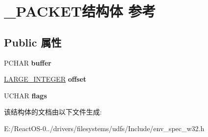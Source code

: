 \hypertarget{struct___p_a_c_k_e_t}{}\section{\+\_\+\+P\+A\+C\+K\+E\+T结构体 参考}
\label{struct___p_a_c_k_e_t}
\subsection*{Public 属性}
\begin{DoxyCompactItemize}
\item 
\mbox{\label{struct___p_a_c_k_e_t_aeac901f907c2020dc5aee0c5df40a0bc}} 
P\+C\+H\+AR {\bfseries buffer}
\item 
\mbox{\label{struct___p_a_c_k_e_t_a900ff47b35059510fbf101e12e41df64}} 
\hyperlink{union___l_a_r_g_e___i_n_t_e_g_e_r}{L\+A\+R\+G\+E\+\_\+\+I\+N\+T\+E\+G\+ER} {\bfseries offset}
\item 
\mbox{\label{struct___p_a_c_k_e_t_a9742d989d9080de0dbe71e543253cff2}} 
U\+C\+H\+AR {\bfseries flags}
\end{DoxyCompactItemize}


该结构体的文档由以下文件生成\+:\begin{DoxyCompactItemize}
\item 
E\+:/\+React\+O\+S-\/0../drivers/filesystems/udfs/\+Include/env\+\_\+spec\+\_\+w32.\+h\end{DoxyCompactItemize}
